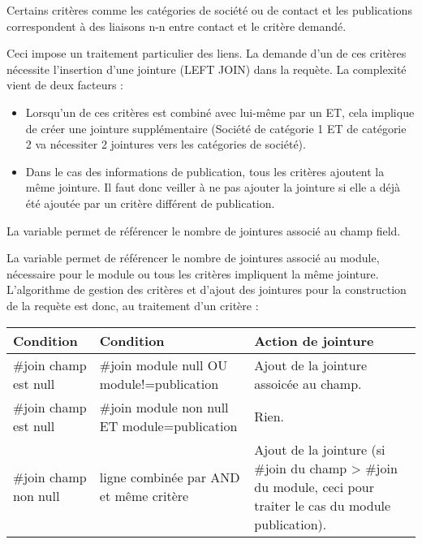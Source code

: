 Certains critères comme les catégories de société ou de contact et les publications correspondent à des liaisons n-n entre contact et le critère demandé.

Ceci impose un traitement particulier des liens.
La demande d'un de ces critères nécessite l'insertion d'une jointure (LEFT JOIN) dans la requète.
La complexité vient de deux facteurs :\\
\begin{itemize}
\item Lorsqu'un de ces critères est combiné avec lui-même par un ET, cela implique de créer une jointure supplémentaire (Société de catégorie 1 ET de catégorie 2 va nécessiter 2 jointures vers les catégories de société).
\item Dans le cas des informations de publication, tous les critères ajoutent la même jointure.
Il faut donc veiller à ne pas ajouter la jointure si elle a déjà été ajoutée par un critère différent de publication.
\end{itemize}
\vspace{0.3cm}

La variable  permet de référencer le nombre de jointures associé au champ field.

La variable  permet de référencer le nombre de jointures associé au module, nécessaire pour le module \publication ou tous les critères impliquent la même jointure.\\

L'algorithme de gestion des critères et d'ajout des jointures pour la construction de la requète est donc, au traitement d'un critère :\\

\begin{tabular}{|l|p{4.5cm}|p{5.5cm}|}
 \hline
 \textbf{Condition} & \textbf{Condition} & \textbf{Action de jointure} \\
 \hline
 \hline
  \#join champ est null & \#join module null OU module!=publication & Ajout de la jointure assoicée au champ. \\ 
 \hline
  \#join champ est null & \#join module non null ET module=publication & Rien. \\ 
 \hline
  \#join champ non null & ligne combinée par AND et même critère & Ajout de la jointure (si \#join du champ > \#join du module, ceci pour traiter le cas du module publication). \\
 \hline
\end{tabular}


